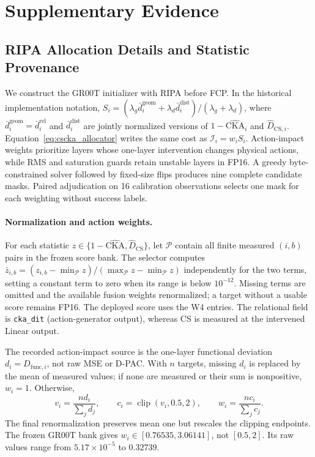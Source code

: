 \section{Supplementary Evidence}
\label{sec:supplement}

\subsection{RIPA Allocation Details and Statistic Provenance}
\label{sec:init_provenance}

We construct the GR00T initializer with RIPA before FCP. In the historical implementation notation, $S_i=(\lambda_g\bar d_i^{\mathrm{geom}}+\lambda_d\bar d_i^{\mathrm{dist}})/(\lambda_g+\lambda_d)$, where $\bar d_i^{\mathrm{geom}}=\bar d_i^{\mathrm{rel}}$ and $\bar d_i^{\mathrm{dist}}$ are jointly normalized versions of $1-\widehat{\mathrm{CKA}}_i$ and $\widehat D_{\mathrm{CS},i}$. Equation~\ref{eq:cscka_allocator} writes the same cost as $\mathcal I_i=w_iS_i$. Action-impact weights prioritize layers whose one-layer intervention changes physical actions, while RMS and saturation guards retain unstable layers in FP16. A greedy byte-constrained solver followed by fixed-size flips produces nine complete candidate masks. Paired adjudication on 16 calibration observations selects one mask for each weighting without success labels.

\paragraph{Normalization and action weights.}
For each statistic $z\in\{1-\widehat{\mathrm{CKA}},\widehat D_{\mathrm{CS}}\}$, let $\mathcal P$ contain all finite measured $(i,b)$ pairs in the frozen score bank. The selector computes $\bar z_{i,b}=(z_{i,b}-\min_{\mathcal P}z)/(\max_{\mathcal P}z-\min_{\mathcal P}z)$ independently for the two terms, setting a constant term to zero when its range is below $10^{-12}$. Missing terms are omitted and the available fusion weights renormalized; a target without a usable score remains FP16. The deployed score uses the W4 entries. The relational field is \texttt{cka\_dit} (action-generator output), whereas CS is measured at the intervened Linear output.

The recorded action-impact source is the one-layer functional deviation $d_i= D_{\mathrm{func},i}$, not raw MSE or D-PAC. With $n$ targets, missing $d_i$ is replaced by the mean of measured values; if none are measured or their sum is nonpositive, $w_i=1$. Otherwise,
\begin{equation}
 v_i=\frac{n d_i}{\sum_jd_j},\qquad c_i=\operatorname{clip}(v_i,0.5,2),\qquad
 w_i=\frac{n c_i}{\sum_jc_j}.
\end{equation}
The final renormalization preserves mean one but rescales the clipping endpoints. The frozen GR00T bank gives $w_i\in[0.76535,3.06141]$, not $[0.5,2]$. Its raw \dfunc values range from $5.17\times10^{-5}$ to $0.32739$.

